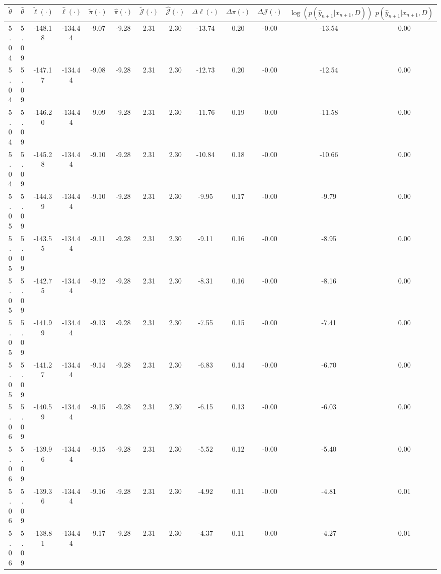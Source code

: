 \begin{table}[htbp]
        \centering
        \tiny
        \begin{adjustbox}{angle=90}
            \begin{tabular}{|c|c|c|c|c|c|c|c|c|c|c|c|c|}
                \hline
                 $\tilde{\theta}$ & $\hat{\theta}$ & $\tilde{\ell}(\cdot)$ & $\hat{\ell}(\cdot)$ & $\tilde{\pi}(\cdot)$ & $\hat{\pi}(\cdot)$ & $\tilde{\mathcal{J}}(\cdot)$ & $\hat{\mathcal{J}}(\cdot)$ & $\Delta \ell(\cdot)$ & $\Delta \pi(\cdot)$ & $\Delta \mathcal{J}(\cdot)$ & $\log(p(\hat{y}_{n+1}|x_{n+1}, D))$ & $p(\hat{y}_{n+1}|x_{n+1}, D)$ \\
                \hline
                 5.04 & 5.09 & -148.18 & -134.44 & -9.07 & -9.28 & 2.31 & 2.30 & -13.74 & 0.20 & -0.00 & -13.54 & 0.00\\ \hline
 5.04 & 5.09 & -147.17 & -134.44 & -9.08 & -9.28 & 2.31 & 2.30 & -12.73 & 0.20 & -0.00 & -12.54 & 0.00\\ \hline
 5.04 & 5.09 & -146.20 & -134.44 & -9.09 & -9.28 & 2.31 & 2.30 & -11.76 & 0.19 & -0.00 & -11.58 & 0.00\\ \hline
 5.04 & 5.09 & -145.28 & -134.44 & -9.10 & -9.28 & 2.31 & 2.30 & -10.84 & 0.18 & -0.00 & -10.66 & 0.00\\ \hline
 5.05 & 5.09 & -144.39 & -134.44 & -9.10 & -9.28 & 2.31 & 2.30 & -9.95 & 0.17 & -0.00 & -9.79 & 0.00\\ \hline
 5.05 & 5.09 & -143.55 & -134.44 & -9.11 & -9.28 & 2.31 & 2.30 & -9.11 & 0.16 & -0.00 & -8.95 & 0.00\\ \hline
 5.05 & 5.09 & -142.75 & -134.44 & -9.12 & -9.28 & 2.31 & 2.30 & -8.31 & 0.16 & -0.00 & -8.16 & 0.00\\ \hline
 5.05 & 5.09 & -141.99 & -134.44 & -9.13 & -9.28 & 2.31 & 2.30 & -7.55 & 0.15 & -0.00 & -7.41 & 0.00\\ \hline
 5.05 & 5.09 & -141.27 & -134.44 & -9.14 & -9.28 & 2.31 & 2.30 & -6.83 & 0.14 & -0.00 & -6.70 & 0.00\\ \hline
 5.06 & 5.09 & -140.59 & -134.44 & -9.15 & -9.28 & 2.31 & 2.30 & -6.15 & 0.13 & -0.00 & -6.03 & 0.00\\ \hline
 5.06 & 5.09 & -139.96 & -134.44 & -9.15 & -9.28 & 2.31 & 2.30 & -5.52 & 0.12 & -0.00 & -5.40 & 0.00\\ \hline
 5.06 & 5.09 & -139.36 & -134.44 & -9.16 & -9.28 & 2.31 & 2.30 & -4.92 & 0.11 & -0.00 & -4.81 & 0.01\\ \hline
 5.06 & 5.09 & -138.81 & -134.44 & -9.17 & -9.28 & 2.31 & 2.30 & -4.37 & 0.11 & -0.00 & -4.27 & 0.01\\ \hline

\end{tabular}
\end{adjustbox}
\end{table}
